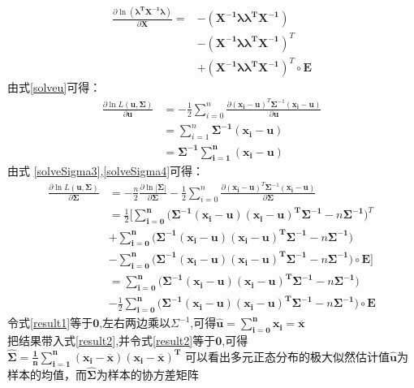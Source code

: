 \documentclass[12pt,a4paper]{ctexart}
\begin{document}
\begin{equation}
\begin{split}
\frac{\partial{\ln(\boldsymbol{\lambda^T X^{-1}\lambda})}}{\partial{\boldsymbol{X}}}
=&-(\boldsymbol{X^{-1} \lambda \lambda^T X^{-1}})\\
&-(\boldsymbol{X^{-1} \lambda \lambda^T X^{-1}})^T\\
&+(\boldsymbol{X^{-1} \lambda \lambda^T X^{-1}})^T \circ \boldsymbol{E}
\label{solveSigma4}
\end{split}
\end{equation}
\noindent 由式\eqref{solveu}可得：
\begin{equation}
\begin{split}
\frac{\partial{\ln{L(\boldsymbol{u},\boldsymbol{\Sigma})}}}{\partial{\boldsymbol{u}}}
&=-\frac{1}{2} \sum_{i=0}^n \frac{\partial{(\boldsymbol{x_i-u})^T\boldsymbol{\Sigma}^{-1}(\boldsymbol{x_i-u})}}{\partial{\boldsymbol{u}}}\\
&=\sum_{i=1}^n \boldsymbol{\Sigma^{-1}(x_i-u)}\\
&=\boldsymbol{\Sigma^{-1} \sum_{i=1}^n (x_i-u)} \label{result1}
\end{split}
\end{equation}
由式 \eqref{solveSigma3},\eqref{solveSigma4}可得：
\begin{equation}
\begin{split}
    \frac{\partial{\ln{L(\boldsymbol{u},\boldsymbol{\Sigma})}}}{\partial{\boldsymbol{\Sigma}}}
    &=-\frac{n}{2} \frac{\partial{\ln|\boldsymbol{\Sigma}|}}{\partial{\boldsymbol{\Sigma}}}-\frac{1}{2} \sum_{i=0}^n \frac{\partial{(\boldsymbol{x_i-u})^T\boldsymbol{\Sigma}^{-1}(\boldsymbol{x_i-u})}}{\partial{\boldsymbol{\Sigma}}}\\
    &=\frac{1}{2} [\boldsymbol{\sum_{i=0}^n (\Sigma^{-1}(x_i-u)(x_i-u)^T \Sigma^{-1}} -n\boldsymbol{\Sigma^{-1}})^T\\
    &+ \boldsymbol{\sum_{i=0}^n (\Sigma^{-1}(x_i-u)(x_i-u)^T \Sigma^{-1}} -n\boldsymbol{\Sigma^{-1}}) \\
    &-\boldsymbol{\sum_{i=0}^n (\Sigma^{-1}(x_i-u)(x_i-u)^T \Sigma^{-1}} -n \boldsymbol{\Sigma^{-1}) \circ E }]\\
    &=\boldsymbol{\sum_{i=0}^n (\Sigma^{-1}(x_i-u)(x_i-u)^T \Sigma^{-1}} -n \boldsymbol{\Sigma^{-1})}\\
    &-\frac{1}{2} \boldsymbol{\sum_{i=0}^n (\Sigma^{-1}(x_i-u)(x_i-u)^T \Sigma^{-1}} -n \boldsymbol{\Sigma^{-1}) \circ E } \label{result2}
\end{split}
\end{equation}
令式\eqref{result1}等于$\boldsymbol{0}$,左右两边乘以$\Sigma^{-1}$,可得$\boldsymbol{\hat{u}=\sum_{i=0}^n x_i=\overline{x}}$\\
把结果带入式\eqref{result2},并令式\eqref{result2}等于$\boldsymbol{0}$,可得$\boldsymbol{\hat{\Sigma} =\frac{1}{n} \sum_{i=1}^n (x_i-\overline{x})(x_i-\overline{x})^T}$
可以看出多元正态分布的极大似然估计值$\boldsymbol{\hat{u}}$为样本的均值，而$\boldsymbol{\hat{\Sigma}}$为样本的协方差矩阵
\end{document}

